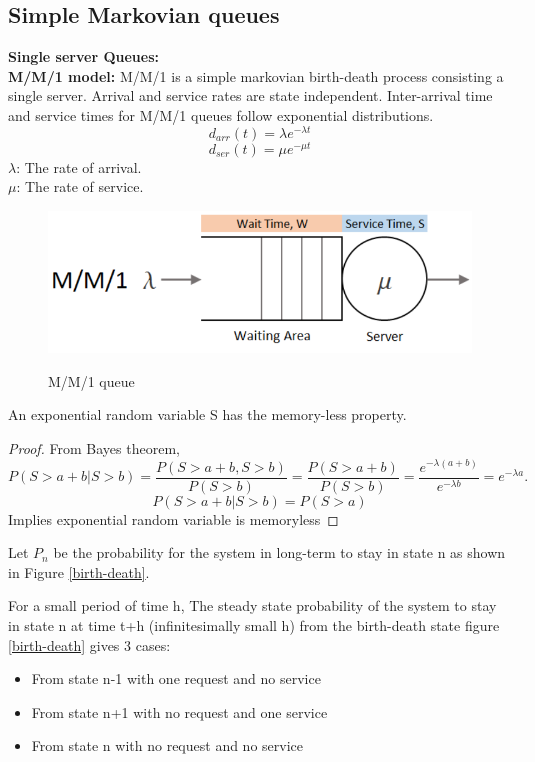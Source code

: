 \subsection{Simple Markovian queues}
\textbf{Single server Queues:}
\\\textbf{M/M/1 model:}
M/M/1 is a simple markovian birth-death process consisting a single server. Arrival and service rates are state independent. Inter-arrival time and service times for M/M/1 queues follow exponential distributions.
\[
d_{arr}(t) = \lambda e^{-\lambda t}
\]
\[
d_{ser}(t) = \mu e^{-\mu t}
\]
$\lambda$: The rate of arrival.
\\$\mu$: The rate of service.
\begin{figure}[ht!]
        \centering
        \includegraphics[scale=0.60]{mm1diagram.PNG}
        \\\caption{M/M/1 queue}
        \label{mm1}
\end{figure}

\begin{theorem}
An exponential random variable S has the memory-less property.
\end{theorem}

\begin{proof}
From Bayes theorem, 
\[
P(S > a+b| S > b) =\frac{P(S > a+b, S > b)}{P(S > b)}
=\frac{P(S > a+b)}{P(S > b)}
=\frac{e^{-\lambda(a+b)}}{e^{-\lambda b}}
= e^{-\lambda a}.
\]
\[
 P(S > a+b | S > b) = P(S>a)
\]
Implies exponential random variable is memoryless
\end{proof}

Let $P_n$ be the probability for the system in long-term to stay in state n as shown in Figure \ref{birth-death}.

For a small period of time h,
The steady state probability of the system to stay in state n at time t+h (infinitesimally small h) from the birth-death state figure \ref{birth-death} gives 3 cases:
\begin{itemize}
  \item From state n-1 with one request and no service
  \item From state n+1 with no request and one service
  \item From state n with no request and no service
\end{itemize}

